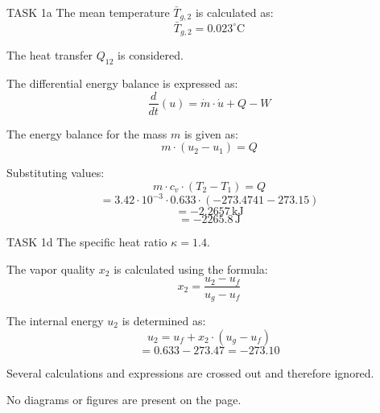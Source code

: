 TASK 1a  
The mean temperature \( \bar{T}_{g,2} \) is calculated as:  
\[
\bar{T}_{g,2} = 0.023^\circ \text{C}
\]  

The heat transfer \( Q_{12} \) is considered.  

The differential energy balance is expressed as:  
\[
\frac{d}{dt} \left( u \right) = \dot{m} \cdot \dot{u} + Q - W
\]  

The energy balance for the mass \( m \) is given as:  
\[
m \cdot (u_2 - u_1) = Q
\]  

Substituting values:  
\[
m \cdot c_v \cdot (T_2 - T_1) = Q
\]  
\[
= 3.42 \cdot 10^{-3} \cdot 0.633 \cdot (-273.4741 - 273.15)
\]  
\[
= -2.2657 \, \text{kJ}
\]  
\[
= -2265.8 \, \text{J}
\]  

TASK 1d  
The specific heat ratio \( \kappa = 1.4 \).  

The vapor quality \( x_2 \) is calculated using the formula:  
\[
x_2 = \frac{u_2 - u_f}{u_g - u_f}
\]  

The internal energy \( u_2 \) is determined as:  
\[
u_2 = u_f + x_2 \cdot (u_g - u_f)
\]  
\[
= 0.633 - 273.47 = -273.10
\]  

Several calculations and expressions are crossed out and therefore ignored.  

No diagrams or figures are present on the page.